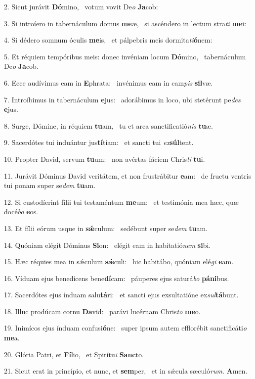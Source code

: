 2. Sicut jurávit \textbf{Dó}mino, \ast\  votum vovit De\textit{o} \textbf{Ja}cob:\

3. Si introíero in tabernáculum domus \textbf{me}æ, \ast\  si ascéndero in lectum stra\textit{ti} \textbf{me}i:\

4. Si dédero somnum óculis \textbf{me}is, \ast\  et pálpebris meis dormita\textit{ti}\textbf{ó}nem:\

5. Et réquiem tempóribus meis: donec invéniam locum \textbf{Dó}mino, \ast\  tabernáculum De\textit{o} \textbf{Ja}cob.\

6. Ecce audívimus eam in \textbf{E}phrata: \ast\  invénimus eam in cam\textit{pis} \textbf{sil}væ.\

7. Introíbimus in tabernáculum \textbf{e}jus: \ast\  adorábimus in loco, ubi stetérunt pe\textit{des} \textbf{e}jus.\

8. Surge, Dómine, in réquiem \textbf{tu}am, \ast\  tu et arca sanctificatió\textit{nis} \textbf{tu}æ.\

9. Sacerdótes tui induántur jus\textbf{tí}tiam: \ast\  et sancti tui \textit{ex}\textbf{súl}tent.\

10. Propter David, servum \textbf{tu}um: \ast\  non avértas fáciem Chris\textit{ti} \textbf{tu}i.\

11. Jurávit Dóminus David veritátem, et non frustrábitur \textbf{e}am: \ast\  de fructu ventris tui ponam super se\textit{dem} \textbf{tu}am.\

12. Si custodíerint fílii tui testaméntum \textbf{me}um: \ast\  et testimónia mea hæc, quæ docé\textit{bo} \textbf{e}os.\

13. Et fílii eórum usque in \textbf{sǽ}culum: \ast\  sedébunt super se\textit{dem} \textbf{tu}am.\

14. Quóniam elégit Dóminus \textbf{Si}on: \ast\  elégit eam in habitatió\textit{nem} \textbf{si}bi.\

15. Hæc réquies mea in sǽculum \textbf{sǽ}culi: \ast\  hic habitábo, quóniam elé\textit{gi} \textbf{e}am.\

16. Víduam ejus benedícens bene\textbf{dí}cam: \ast\  páuperes ejus saturá\textit{bo} \textbf{pá}\textbf{ni}bus.\

17. Sacerdótes ejus índuam salu\textbf{tá}ri: \ast\  et sancti ejus exsultatióne ex\textit{sul}\textbf{tá}bunt.\

18. Illuc prodúcam cornu \textbf{Da}vid: \ast\  parávi lucérnam Chris\textit{to} \textbf{me}o.\

19. Inimícos ejus índuam confusi\textbf{ó}ne: \ast\  super ipsum autem efflorébit sanctificáti\textit{o} \textbf{me}a.\

20. Glória Patri, et \textbf{Fí}lio, \ast\  et Spirítu\textit{i} \textbf{Sanc}to.\

21. Sicut erat in princípio, et nunc, et \textbf{sem}per, \ast\  et in sǽcula sæculó\textit{rum}. \textbf{A}men.\

